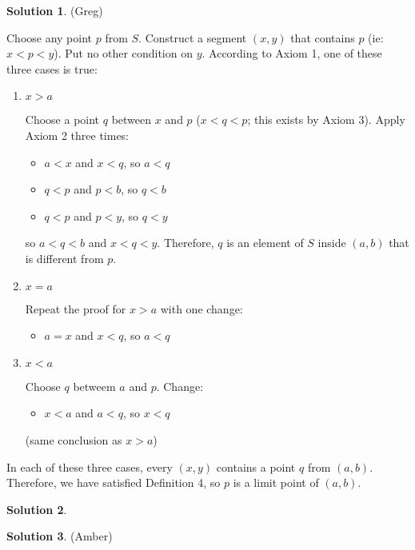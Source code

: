 \documentclass{article}
\theoremstyle{definition}
\newtheorem{solution}{Solution}
\begin{document}
\begin{solution} %
(Greg)

Choose any point $p$ from $S$.
Construct a segment $(x, y)$ that contains $p$ (ie: $x < p < y$).
Put no other condition on $y$.
According to Axiom 1, one of these three cases is true:

\begin{enumerate}
\item 
$x > a$

Choose a point $q$ between $x$ and $p$ ($x < q < p$; this exists by Axiom 3).
Apply Axiom 2 three times:
\begin{itemize}
\item $a < x$ and $x < q$, so $a < q$
\item $q < p$ and $p < b$, so $q < b$
\item $q < p$ and $p < y$, so $q < y$
\end{itemize}

so $a < q < b$ and $x < q < y$.
Therefore, $q$ is an element of $S$ inside $(a, b)$ that is different from $p$.

\item
$x = a$

Repeat the proof for $x > a$ with one change:

\begin{itemize}
\item $a = x$ and $x < q$, so $a < q$
\end{itemize}

\item
$x < a$

Choose $q$ betweem $a$ and $p$.
Change:

\begin{itemize}
\item $x < a$ and $a < q$, so $x < q$
\end{itemize}

(same conclusion as $x > a$)
\end{enumerate}

In each of these three cases, every $(x,y)$ contains a point $q$ from $(a, b)$.
Therefore, we have satisfied Definition 4, so $p$ is a limit point of $(a, b)$.

\end{solution}

\begin{solution} %
\end{solution}

\begin{solution} %
(Amber)

\end{solution}
\end{document}
